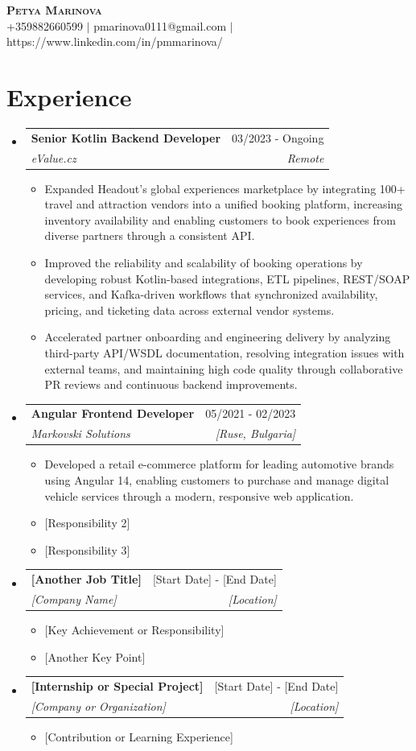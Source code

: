 \documentclass[letterpaper,11pt]{article}
\makeatletter
\newcommand{\resumeItem}[1]{
  \item\small{
    {#1 \vspace{-2pt}}
  }
}
\newcommand{\resumeSubheading}[4]{
  \vspace{-2pt}\item
    \begin{tabular*}{0.97\textwidth}[t]{l@{\extracolsep{\fill}}r}
      \textbf{#1} & #2 \\
      \textit{\small#3} & \textit{\small #4} \\
    \end{tabular*}\vspace{-7pt}
}
\newcommand{\resumeSubHeadingListStart}{\begin{itemize}[leftmargin=0.15in, label={}]}
\newcommand{\resumeSubHeadingListEnd}{\end{itemize}}
\newcommand{\resumeItemListStart}{\begin{itemize}}
\newcommand{\resumeItemListEnd}{\end{itemize}\vspace{-5pt}}
\makeatother
\begin{document}
\begin{center}
    \textbf{\Huge \scshape Petya Marinova} \\ \vspace{1pt}
    \small +359882660599 $|$ pmarinova0111@gmail.com $|$ https://www.linkedin.com/in/pmmarinova/
\end{center}


\section{Experience}
\resumeSubHeadingListStart
    \resumeSubheading
      {Senior Kotlin Backend Developer}{03/2023 - Ongoing}
      {eValue.cz}{Remote}
      \resumeItemListStart
        \resumeItem{Expanded Headout's global experiences marketplace by integrating 100+ travel and attraction vendors into a unified booking platform, increasing inventory availability and enabling customers to book experiences from diverse partners through a consistent API.}
        \resumeItem{Improved the reliability and scalability of booking operations by developing robust Kotlin-based integrations, ETL pipelines, REST/SOAP services, and Kafka-driven workflows that synchronized availability, pricing, and ticketing data across external vendor systems.}
        \resumeItem{Accelerated partner onboarding and engineering delivery by analyzing third-party API/WSDL documentation, resolving integration issues with external teams, and maintaining high code quality through collaborative PR reviews and continuous backend improvements.}
      \resumeItemListEnd

    \resumeSubheading
      {Angular Frontend Developer}{05/2021 - 02/2023}
      {Markovski Solutions}{[Ruse, Bulgaria]}
      \resumeItemListStart
        \resumeItem{Developed a retail e-commerce platform for leading automotive brands using Angular 14, enabling customers to purchase and manage digital vehicle services through a modern, responsive web application. }
        \resumeItem{[Responsibility 2]}
        \resumeItem{[Responsibility 3]}
      \resumeItemListEnd

    \resumeSubheading
      {[Another Job Title]}{[Start Date] - [End Date]}
      {[Company Name]}{[Location]}
      \resumeItemListStart
        \resumeItem{[Key Achievement or Responsibility]}
        \resumeItem{[Another Key Point]}
      \resumeItemListEnd

    \resumeSubheading
      {[Internship or Special Project]}{[Start Date] - [End Date]}
      {[Company or Organization]}{[Location]}
      \resumeItemListStart
        \resumeItem{[Contribution or Learning Experience]}
      \resumeItemListEnd
\resumeSubHeadingListEnd
\end{document}
